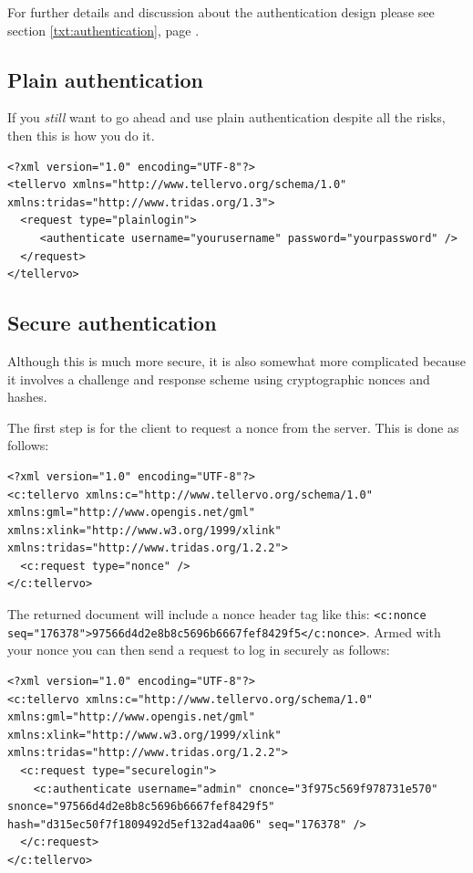 For further details and discussion about the authentication design please see section \ref{txt:authentication}, page \pageref{txt:authentication}.

\subsection{Plain authentication}

If you \emph{still} want to go ahead and use plain authentication despite all the risks, then this is how you do it.

\begin{lstlisting}
<?xml version="1.0" encoding="UTF-8"?>
<tellervo xmlns="http://www.tellervo.org/schema/1.0" xmlns:tridas="http://www.tridas.org/1.3">
  <request type="plainlogin">
     <authenticate username="yourusername" password="yourpassword" />
  </request>
</tellervo>
\end{lstlisting}

\subsection{Secure authentication}

Although this is much more secure, it is also somewhat more complicated because it involves a challenge and response scheme using cryptographic nonces and hashes.  

The first step is for the client to request a nonce from the server.  This is done as follows:

\begin{lstlisting}
<?xml version="1.0" encoding="UTF-8"?>
<c:tellervo xmlns:c="http://www.tellervo.org/schema/1.0" xmlns:gml="http://www.opengis.net/gml" xmlns:xlink="http://www.w3.org/1999/xlink" xmlns:tridas="http://www.tridas.org/1.2.2">
  <c:request type="nonce" />
</c:tellervo>
\end{lstlisting}

The returned document will include a nonce header tag like this: \lstinline$<c:nonce seq="176378">97566d4d2e8b8c5696b6667fef8429f5</c:nonce>$.  Armed with your nonce you can then send a request to log in securely as follows:

\begin{lstlisting}
<?xml version="1.0" encoding="UTF-8"?>
<c:tellervo xmlns:c="http://www.tellervo.org/schema/1.0" xmlns:gml="http://www.opengis.net/gml" xmlns:xlink="http://www.w3.org/1999/xlink" xmlns:tridas="http://www.tridas.org/1.2.2">
  <c:request type="securelogin">
    <c:authenticate username="admin" cnonce="3f975c569f978731e570" snonce="97566d4d2e8b8c5696b6667fef8429f5" hash="d315ec50f7f1809492d5ef132ad4aa06" seq="176378" />
  </c:request>
</c:tellervo>
\end{lstlisting}

